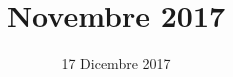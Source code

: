 


\title{ Novembre 2017}
\author{\GroupName}

\date{17 Dicembre 2017}



\frenchspacing

\makeFrontPage




